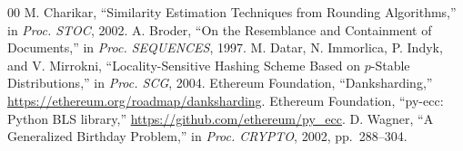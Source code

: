 \documentclass[conference]{IEEEtran}
\begin{document}
\begin{thebibliography}{00}
 M. Charikar, ``Similarity Estimation Techniques from Rounding Algorithms,'' in \textit{Proc. STOC}, 2002.
 A. Broder, ``On the Resemblance and Containment of Documents,'' in \textit{Proc. SEQUENCES}, 1997.
 M. Datar, N. Immorlica, P. Indyk, and V. Mirrokni, ``Locality-Sensitive Hashing Scheme Based on $p$-Stable Distributions,'' in \textit{Proc. SCG}, 2004.
 Ethereum Foundation, ``Danksharding,'' \url{https://ethereum.org/roadmap/danksharding}.
 Ethereum Foundation, ``py-ecc: Python BLS library,'' \url{https://github.com/ethereum/py_ecc}.
 D. Wagner, ``A Generalized Birthday Problem,'' in \textit{Proc. CRYPTO}, 2002, pp.\ 288--304.

\end{thebibliography}
\end{document}
